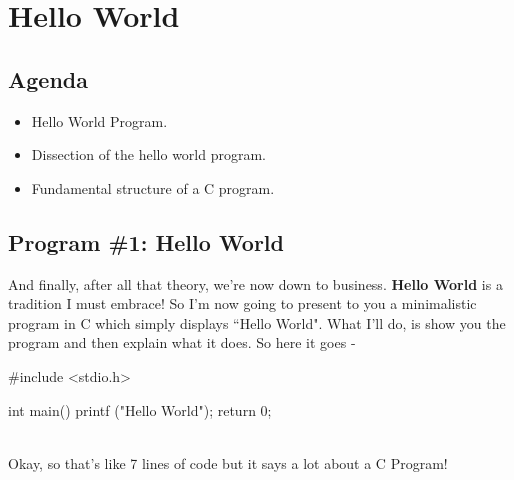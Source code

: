 \chapter{Hello World}


\section{Agenda}
\begin{itemize}
 \item Hello World Program.
 \item Dissection of the hello world program.
 \item Fundamental structure of a C program.
\end{itemize}

\section{Program \#1: Hello World}
And finally, after all that theory, we're now down to business. \textbf{Hello World} is a tradition I must embrace! So I'm now going to present to you a minimalistic program in C which simply displays ``Hello World". What I'll do, is show you the program and then explain what it does. So here it goes - \\

\begin{ccode}
#include <stdio.h>

int main()
{
  printf ("Hello World\n");
  return 0;
}
\end{ccode}
\\

Okay, so that's like 7 lines of code but it says a lot about a C Program!

